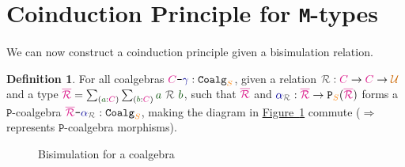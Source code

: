 \documentclass[twoside,11pt,openright]{report}
\theoremstyle{plain} %
\theoremstyle{definition}
\newtheorem{defn}[thm]{Definition}%
\theoremstyle{remark}
\newcommand*{\figref}[1]{\hyperref[fig:#1]{Figure~\ref*{fig:#1}}}
\newcommand*{\term}[1]{\textcolor{green!30!black}{#1}} %
\newcommand*{\type}[1]{\textcolor{magenta!90!black}{#1}}
\newcommand*{\container}[1]{\textcolor{orange}{#1}}
\newcommand*{\universe}[1]{\textcolor{orange!80!black}{#1}}
\newcommand*{\coalg}[2]{#1\texttt{-}#2}
\newcommand*{\relation}[1]{\textcolor{gray!75!black}{\ensuremath{\mathtt{#1}}}}
\newcommand*{\function}[1]{\textcolor{blue!60!black}{\ensuremath{\mathtt{#1}}}}
\newcommand*{\typeformer}[1]{\ensuremath{\mathtt{#1}}}
\newcommand*{\functor}[1]{\ensuremath{\mathbf{\mathtt{#1}}}}
\begin{document}
\section{Coinduction Principle for \texttt{M}-types}
We can now construct a coinduction principle given a bisimulation relation.
\begin{defn}
  For all coalgebras \(\coalg{\type{C}}{\function{\gamma}} : \typeformer{Coalg}_{\container{S}}\), given a relation \(\relation{\mathcal{R}} : \type{C} \rightarrow \type{C} \rightarrow \universe{\mathcal{U}}\) and a type \(\type{\overline{\mathcal{R}}} = \sum_{(\term{a} : \type{C})} \sum_{(\term{b} : \type{C})} \term{a}~\relation{\mathcal{R}}~\term{b}\), such that \(\type{\overline{\mathcal{R}}}\) and \(\function{\alpha}_{\relation{\mathcal{R}}} : \type{\overline{\mathcal{R}}} \rightarrow \functor{P}_{\container{S}}(\type{\overline{\mathcal{R}}})\) forms a \(\functor{P}\)-coalgebra \(\coalg{\type{\overline{\mathcal{R}}}}{\function{\alpha}_{\relation{\mathcal{R}}}} : \mathtt{Coalg}_{\container{S}}\), making the diagram in \figref{coalgebra-coinduction-definition} commute  (\(\Longrightarrow\) represents \(\functor{P}\)-coalgebra morphisms).
  \begin{figure}[h]
    \centering
    \caption{Bisimulation for a coalgebra}
    \label{fig:coalgebra-coinduction-definition}
  \end{figure}
\end{defn}
\end{document}
